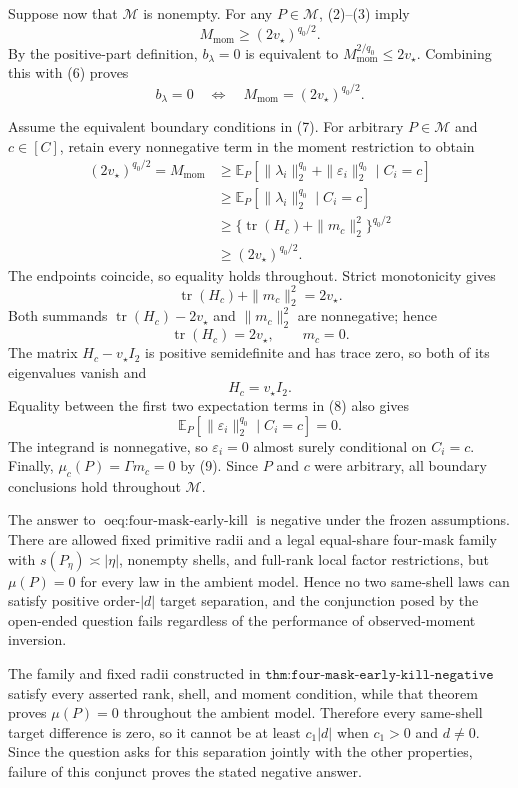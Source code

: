 Suppose now that \(\mathcal M\) is nonempty. For any \(P\in\mathcal M\), (2)--(3) imply
\[
M_{\mathrm{mom}}\geq(2v_\star)^{q_0/2}.
\tag{6}
\]
By the positive-part definition, \(b_\lambda=0\) is equivalent to \(M_{\mathrm{mom}}^{2/q_0}\leq2v_\star\). Combining this with (6) proves
\[
b_\lambda=0
\quad\Longleftrightarrow\quad
M_{\mathrm{mom}}=(2v_\star)^{q_0/2}.
\tag{7}
\]

Assume the equivalent boundary conditions in (7). For arbitrary \(P\in\mathcal M\) and \(c\in[C]\), retain every nonnegative term in the moment restriction to obtain
\[
\begin{aligned}
(2v_\star)^{q_0/2}=M_{\mathrm{mom}}
&\geq\mathbb E_P[\|\lambda_i\|_2^{q_0}+\|\varepsilon_i\|_2^{q_0}\mid C_i=c]\\
&\geq\mathbb E_P[\|\lambda_i\|_2^{q_0}\mid C_i=c]\\
&\geq\{\operatorname{tr}(H_c)+\|m_c\|_2^2\}^{q_0/2}\\
&\geq(2v_\star)^{q_0/2}.
\end{aligned}
\tag{8}
\]
The endpoints coincide, so equality holds throughout. Strict monotonicity gives
\[
\operatorname{tr}(H_c)+\|m_c\|_2^2=2v_\star.
\]
Both summands \(\operatorname{tr}(H_c)-2v_\star\) and \(\|m_c\|_2^2\) are nonnegative; hence
\[
\operatorname{tr}(H_c)=2v_\star,
\qquad
m_c=0.
\tag{9}
\]
The matrix \(H_c-v_\star I_2\) is positive semidefinite and has trace zero, so both of its eigenvalues vanish and
\[
H_c=v_\star I_2.
\tag{10}
\]
Equality between the first two expectation terms in (8) also gives
\[
\mathbb E_P[\|\varepsilon_i\|_2^{q_0}\mid C_i=c]=0.
\]
The integrand is nonnegative, so \(\varepsilon_i=0\) almost surely conditional on \(C_i=c\). Finally, \(\mu_c(P)=\Gamma m_c=0\) by (9). Since \(P\) and \(c\) were arbitrary, all boundary conclusions hold throughout \(\mathcal M\).

The answer to \(\operatorname{oeq:four\text{-}mask\text{-}early\text{-}kill}\) is negative under the frozen assumptions. There are allowed fixed primitive radii and a legal equal-share four-mask family with \(s(P_\eta)\asymp|\eta|\), nonempty shells, and full-rank local factor restrictions, but \(\mu(P)=0\) for every law in the ambient model. Hence no two same-shell laws can satisfy positive order-\(|d|\) target separation, and the conjunction posed by the open-ended question fails regardless of the performance of observed-moment inversion.

The family and fixed radii constructed in \(\texttt{thm:four-mask-early-kill-negative}\) satisfy every asserted rank, shell, and moment condition, while that theorem proves \(\mu(P)=0\) throughout the ambient model. Therefore every same-shell target difference is zero, so it cannot be at least \(c_1|d|\) when \(c_1>0\) and \(d\neq0\). Since the question asks for this separation jointly with the other properties, failure of this conjunct proves the stated negative answer.


